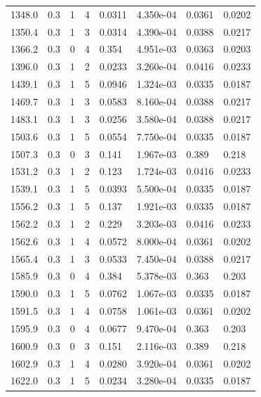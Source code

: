 \documentclass[preview]{standalone}
\begin{document}
{{{\begin{tabular}{L{1.2cm}C{1.2cm} C{0.3cm}C{0.5cm} C{1.4cm}C{1.4cm} C{1.4cm}C{1.4cm}}
  1348.0  &   0.3  & 1     &  4 &  0.0311  & 4.350e-04  & 0.0361 &  0.0202   \\ 
  1350.4  &   0.3  & 1     &  3 &  0.0314  & 4.390e-04  & 0.0388 &  0.0217   \\ 
  1366.2  &   0.3  & 0     &  4 &  0.354  & 4.951e-03  & 0.0363 &  0.0203   \\ 
  1396.0  &   0.3  & 1     &  2 &  0.0233  & 3.260e-04  & 0.0416 &  0.0233   \\ 
  1439.1  &   0.3  & 1     &  5 &  0.0946  & 1.324e-03  & 0.0335 &  0.0187   \\ 
  1469.7  &   0.3  & 1     &  3 &  0.0583  & 8.160e-04  & 0.0388 &  0.0217   \\ 
  1483.1  &   0.3  & 1     &  3 &  0.0256  & 3.580e-04  & 0.0388 &  0.0217   \\ 
  1503.6  &   0.3  & 1     &  5 &  0.0554  & 7.750e-04  & 0.0335 &  0.0187   \\ 
  1507.3  &   0.3  & 0     &  3 &  0.141  & 1.967e-03  & 0.389 &  0.218   \\ 
  1531.2  &   0.3  & 1     &  2 &  0.123  & 1.724e-03  & 0.0416 &  0.0233   \\ 
  1539.1  &   0.3  & 1     &  5 &  0.0393  & 5.500e-04  & 0.0335 &  0.0187   \\ 
  1556.2  &   0.3  & 1     &  5 &  0.137  & 1.921e-03  & 0.0335 &  0.0187   \\ 
  1562.2  &   0.3  & 1     &  2 &  0.229  & 3.203e-03  & 0.0416 &  0.0233   \\ 
  1562.6  &   0.3  & 1     &  4 &  0.0572  & 8.000e-04  & 0.0361 &  0.0202   \\ 
  1565.4  &   0.3  & 1     &  3 &  0.0533  & 7.450e-04  & 0.0388 &  0.0217   \\ 
  1585.9  &   0.3  & 0     &  4 &  0.384  & 5.378e-03  & 0.363 &  0.203   \\ 
  1590.0  &   0.3  & 1     &  5 &  0.0762  & 1.067e-03  & 0.0335 &  0.0187   \\ 
  1591.5  &   0.3  & 1     &  4 &  0.0758  & 1.061e-03  & 0.0361 &  0.0202   \\ 
  1595.9  &   0.3  & 0     &  4 &  0.0677  & 9.470e-04  & 0.363 &  0.203   \\ 
  1600.9  &   0.3  & 0     &  3 &  0.151  & 2.116e-03  & 0.389 &  0.218   \\ 
  1602.9  &   0.3  & 1     &  4 &  0.0280  & 3.920e-04  & 0.0361 &  0.0202   \\ 
  1622.0  &   0.3  & 1     &  5 &  0.0234  & 3.280e-04  & 0.0335 &  0.0187   \\ 

\end{tabular}}}}
\end{document}
